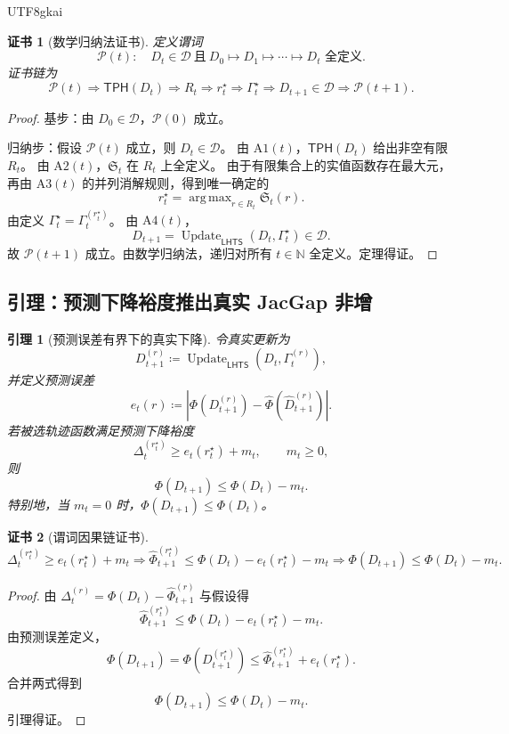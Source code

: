 \documentclass[12pt]{article}
\newtheorem{lemma}{引理}[section]
\newtheorem{Certificate}{证书}[section]
\newcommand{\NN}{\mathbb{N}}
\newcommand{\LHTS}{\ensuremath{\mathsf{LHTS}}}
\newcommand{\TPH}{\ensuremath{\mathsf{TPH}}}
\newcommand{\DefEq}{\coloneqq}
\DeclareMathOperator{\Update}{Update}
\DeclareMathOperator*{\argmax}{arg\,max}
\begin{document}
\begin{CJK*}{UTF8}{gkai}
\begin{Certificate}[数学归纳法证书]
定义谓词
\[
\mathcal P(t):
\quad
D_t\in\mathcal D
\ \text{且}\
D_0\mapsto D_1\mapsto\cdots\mapsto D_t
\text{ 全定义}.
\]
证书链为
\[
\boxed{
\mathcal P(t)
\Rightarrow
\TPH(D_t)
\Rightarrow
R_t
\Rightarrow
r_t^\star
\Rightarrow
\Gamma_t^\star
\Rightarrow
D_{t+1}\in\mathcal D
\Rightarrow
\mathcal P(t+1).
}
\]
\end{Certificate}

\begin{proof}
基步：由 \(D_0\in\mathcal D\)，\(\mathcal P(0)\) 成立。

归纳步：假设 \(\mathcal P(t)\) 成立，则 \(D_t\in\mathcal D\)。
由 \(\mathrm{A1}(t)\)，\(\TPH(D_t)\) 给出非空有限 \(R_t\)。
由 \(\mathrm{A2}(t)\)，\(\mathfrak S_t\) 在 \(R_t\) 上全定义。
由于有限集合上的实值函数存在最大元，再由
\(\mathrm{A3}(t)\) 的并列消解规则，得到唯一确定的
\[
r_t^\star=\argmax_{r\in R_t}\mathfrak S_t(r).
\]
由定义 \(\Gamma_t^\star=\Gamma_t^{(r_t^\star)}\)。
由 \(\mathrm{A4}(t)\)，
\[
D_{t+1}=\Update_{\LHTS}(D_t,\Gamma_t^\star)\in\mathcal D.
\]
故 \(\mathcal P(t+1)\) 成立。由数学归纳法，递归对所有
\(t\in\NN\) 全定义。定理得证。
\end{proof}

\subsection{引理：预测下降裕度推出真实 JacGap 非增}
\label{subsec:prediction-margin-lemma}

\begin{lemma}[预测误差有界下的真实下降]
令真实更新为
\[
D_{t+1}^{(r)}
\DefEq
\Update_{\LHTS}(D_t,\Gamma_t^{(r)}),
\]
并定义预测误差
\[
e_t(r)
\DefEq
\left|
\Phi(D_{t+1}^{(r)})
-
\widehat\Phi(\widehat D_{t+1}^{(r)})
\right|.
\]
若被选轨迹函数满足预测下降裕度
\[
\Delta_t^{(r_t^\star)}
\ge
e_t(r_t^\star)+m_t,
\qquad
m_t\ge0,
\]
则
\[
\boxed{
\Phi(D_{t+1})\le \Phi(D_t)-m_t.
}
\]
特别地，当 \(m_t=0\) 时，\(\Phi(D_{t+1})\le\Phi(D_t)\)。
\end{lemma}

\begin{Certificate}[谓词因果链证书]
\[
\boxed{
\Delta_t^{(r_t^\star)}
\ge e_t(r_t^\star)+m_t
\Rightarrow
\widehat\Phi_{t+1}^{(r_t^\star)}
\le
\Phi(D_t)-e_t(r_t^\star)-m_t
\Rightarrow
\Phi(D_{t+1})\le\Phi(D_t)-m_t.
}
\]
\end{Certificate}

\begin{proof}
由 \(\Delta_t^{(r)}=\Phi(D_t)-\widehat\Phi_{t+1}^{(r)}\) 与假设得
\[
\widehat\Phi_{t+1}^{(r_t^\star)}
\le
\Phi(D_t)-e_t(r_t^\star)-m_t.
\]
由预测误差定义，
\[
\Phi(D_{t+1})
=
\Phi(D_{t+1}^{(r_t^\star)})
\le
\widehat\Phi_{t+1}^{(r_t^\star)}
+
e_t(r_t^\star).
\]
合并两式得到
\[
\Phi(D_{t+1})
\le
\Phi(D_t)-m_t.
\]
引理得证。
\end{proof}


\end{CJK*}
\end{document}
